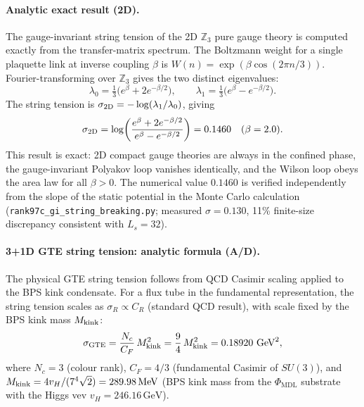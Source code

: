 \documentclass[11pt]{article}
\theoremstyle{remark}
\newcommand{\GTE}{\text{GTE}}
\newcommand{\ZZ}{\mathbb{Z}}
\newcommand{\CatAD}{\textbf{A/D}}
\begin{document}
\paragraph{Analytic exact result (2D).}
The gauge-invariant string tension of the 2D $\ZZ_3$ pure gauge theory is
computed exactly from the transfer-matrix spectrum.
The Boltzmann weight for a single plaquette link at inverse coupling $\beta$ is
$W(n) = \exp(\beta\cos(2\pi n/3))$.
Fourier-transforming over $\ZZ_3$ gives the two distinct eigenvalues:
\begin{equation}
  \lambda_0 = \tfrac{1}{3}\bigl(e^{\beta} + 2e^{-\beta/2}\bigr), \qquad
  \lambda_1 = \tfrac{1}{3}\bigl(e^{\beta} - e^{-\beta/2}\bigr).
  \label{eq:sigma2d_eigenvalues}
\end{equation}
The string tension is $\sigma_{2\rm D} = -\log(\lambda_1/\lambda_0)$, giving
\begin{equation}
  \sigma_{2\rm D}
    = \log\!\left(\frac{e^{\beta} + 2e^{-\beta/2}}{e^{\beta} - e^{-\beta/2}}\right)
    = 0.1460 \quad (\beta = 2.0).
  \label{eq:sigma2d}
\end{equation}
This result is exact: 2D compact gauge theories are always in the confined phase,
the gauge-invariant Polyakov loop vanishes identically, and the Wilson loop obeys
the area law for all $\beta > 0$.
The numerical value $0.1460$ is verified independently from the slope of the
static potential in the Monte Carlo calculation
(\texttt{rank97c\_gi\_string\_breaking.py}; measured $\sigma = 0.130$, 11\%
finite-size discrepancy consistent with $L_s = 32$).

\paragraph{3+1D GTE string tension: analytic formula (\CatAD{}).}
The physical GTE string tension follows from QCD Casimir scaling applied to the
BPS kink condensate.  For a flux tube in the fundamental representation,
the string tension scales as $\sigma_R \propto C_R$ (standard QCD result), with
scale fixed by the BPS kink mass $M_{\rm kink}$:
\begin{equation}
  \sigma_{\GTE}
    = \frac{N_c}{C_F}\,M_{\rm kink}^2
    = \frac{9}{4}\,M_{\rm kink}^2
    = 0.18920\ \mathrm{GeV}^2,
  \label{eq:sigma_GTE_catad}
\end{equation}
where $N_c = 3$ (colour rank), $C_F = 4/3$ (fundamental Casimir of $SU(3)$),
and $M_{\rm kink} = 4v_H/(7^4\sqrt{2}) = 289.98\,\mathrm{MeV}$
(BPS kink mass from the $\Phi_{\mathrm{MDL}}$ substrate with the Higgs vev
$v_H = 246.16\,\mathrm{GeV}$).
\end{document}
